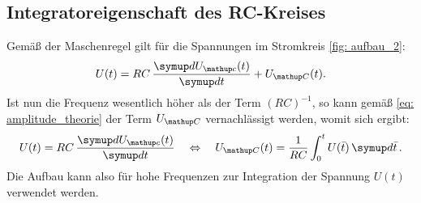 \subsection{Integratoreigenschaft des RC-Kreises}
Gemäß der Maschenregel gilt für die Spannungen im Stromkreis \ref{fig: aufbau_2}:
\begin{equation}
  U(t) = RC\,\frac{\dif{U\ua{c}(t)}}{\dif{t}} + U\ua{C}(t). %
\end{equation}
Ist nun die Frequenz wesentlich höher als der Term $(RC)^{-1}$, so kann gemäß \eqref{eq: amplitude_theorie} der Term $U\ua{C}$ vernachlässigt werden, womit
sich ergibt:
\begin{equation}
  U(t) = RC\,\frac{\dif{U\ua{c}(t)}}{\dif{t}} \quad \Leftrightarrow \quad U\ua{C}(t) = \frac{1}{RC}\int_0^t U(\bar{t})\dif{\bar{t}}. %
\end{equation}
Die Aufbau kann also für hohe Frequenzen zur Integration der Spannung $U(t)$ verwendet werden.
